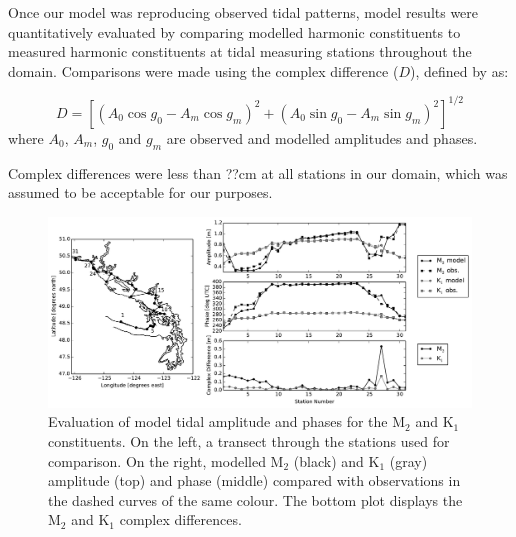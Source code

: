 \documentclass[pdftex,10pt]{article}
\begin{document}

Once our model was reproducing observed tidal patterns, model results were quantitatively evaluated by comparing modelled harmonic constituents to measured harmonic constituents at tidal measuring stations throughout the domain. Comparisons were made using the complex difference ($D$), defined by \citep{foreman1995tidal} as:

\begin{equation}
D = [(A_0 \cos g_0 - A_m \cos g_m)^2 + (A_0 \sin g_0 - A_m \sin g_m)^2]^{1/2}
\end{equation}\label{eq:compdiff}
where $A_0$, $A_m$, $g_0$ and $g_m$ are observed and modelled amplitudes and phases.




Complex differences were less than ??cm at all stations in our domain, which was assumed to be acceptable for our purposes. 

\begin{figure}
\centering
\includegraphics[scale=0.6]{Figures/tides.pdf}
\caption{Evaluation of model tidal amplitude and phases for the M$_2$ and K$_1$ constituents. On the left, a transect through the stations used for comparison. On the right, modelled M$_2$ (black) and K$_1$ (gray) amplitude (top) and phase (middle) compared with observations in the dashed curves of the same colour. The bottom plot displays the M$_2$ and K$_1$ complex differences.  }
\label{fig:tides}
\end{figure}
\end{document}

